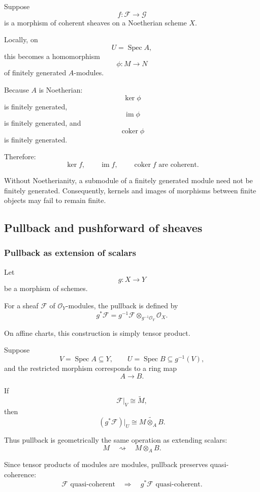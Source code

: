Suppose
\[
f:\mathcal{F}\longrightarrow\mathcal{G}
\]
is a morphism of coherent sheaves on a Noetherian scheme \(X\).

Locally, on
\[
U=\operatorname{Spec} A,
\]
this becomes a homomorphism
\[
\phi:M\longrightarrow N
\]
of finitely generated \(A\)-modules.

Because \(A\) is Noetherian:
\[
\ker\phi
\]
is finitely generated,
\[
\operatorname{im}\phi
\]
is finitely generated, and
\[
\operatorname{coker}\phi
\]
is finitely generated.

Therefore:
\[
\boxed{
	\ker f,\qquad
	\operatorname{im} f,\qquad
	\operatorname{coker} f
	\text{ are coherent.}
}
\]

Without Noetherianity, a submodule of a finitely generated module need not be finitely generated. Consequently, kernels and images of morphisms between finite objects may fail to remain finite.

\subsection{Pullback and pushforward of sheaves}

\subsubsection{Pullback as extension of scalars}

Let
\[
g:X\longrightarrow Y
\]
be a morphism of schemes.

For a sheaf \(\mathcal{F}\) of \(\mathcal{O}_Y\)-modules, the pullback is defined by
\[
g^*\mathcal{F}
=
g^{-1}\mathcal{F}
\otimes_{g^{-1}\mathcal{O}_Y}
\mathcal{O}_X.
\]

On affine charts, this construction is simply tensor product.

Suppose
\[
V=\operatorname{Spec} A\subseteq Y,
\qquad
U=\operatorname{Spec} B\subseteq g^{-1}(V),
\]
and the restricted morphism corresponds to a ring map
\[
A\longrightarrow B.
\]

If
\[
\mathcal{F}|_V\cong\widetilde{M},
\]
then
\[
(g^*\mathcal{F})|_U
\cong
\widetilde{M\otimes_A B}.
\]

Thus pullback is geometrically the same operation as extending scalars:
\[
M
\quad\rightsquigarrow\quad
M\otimes_A B.
\]

Since tensor products of modules are modules, pullback preserves quasi-coherence:
\[
\boxed{
	\mathcal{F}\text{ quasi-coherent}
	\quad\Longrightarrow\quad
	g^*\mathcal{F}\text{ quasi-coherent}.
}
\]

